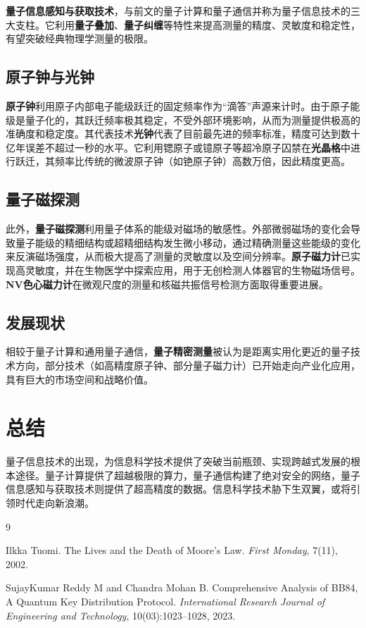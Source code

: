 \documentclass{article}
\begin{document}
\textbf{量子信息感知与获取技术}，与前文的量子计算和量子通信并称为量子信息技术的三大支柱。它利用\textbf{量子叠加}、\textbf{量子纠缠}等特性来提高测量的精度、灵敏度和稳定性，有望突破经典物理学测量的极限。

\subsection{原子钟与光钟}

\textbf{原子钟}利用原子内部电子能级跃迁的固定频率作为“滴答”声源来计时。由于原子能级是量子化的，其跃迁频率极其稳定，不受外部环境影响，从而为测量提供极高的准确度和稳定度。其代表技术\textbf{光钟}代表了目前最先进的频率标准，精度可达到数十亿年误差不超过一秒的水平。它利用锶原子或镱原子等超冷原子囚禁在\textbf{光晶格}中进行跃迁，其频率比传统的微波原子钟（如铯原子钟）高数万倍，因此精度更高。

\subsection{量子磁探测}

此外，\textbf{量子磁探测}利用量子体系的能级对磁场的敏感性。外部微弱磁场的变化会导致量子能级的精细结构或超精细结构发生微小移动，通过精确测量这些能级的变化来反演磁场强度，从而极大提高了测量的灵敏度以及空间分辨率。\textbf{原子磁力计}已实现高灵敏度，并在生物医学中探索应用，用于无创检测人体器官的生物磁场信号。\textbf{NV色心磁力计}在微观尺度的测量和核磁共振信号检测方面取得重要进展。

\subsection{发展现状}

相较于量子计算和通用量子通信，\textbf{量子精密测量}被认为是距离实用化更近的量子技术方向，部分技术（如高精度原子钟、部分量子磁力计）已开始走向产业化应用，具有巨大的市场空间和战略价值。

\section{总结}

量子信息技术的出现，为信息科学技术提供了突破当前瓶颈、实现跨越式发展的根本途径。量子计算提供了超越极限的算力，量子通信构建了绝对安全的网络，量子信息感知与获取技术则提供了超高精度的数据。信息科学技术胁下生双翼，或将引领时代走向新浪潮。

\begin{thebibliography}{9}

Ilkka Tuomi.
\newblock The Lives and the Death of Moore's Law.
\newblock \emph{First Monday}, 7(11), 2002.

SujayKumar Reddy M and Chandra Mohan B.
\newblock Comprehensive Analysis of BB84, A Quantum Key Distribution Protocol.
\newblock \emph{International Research Journal of Engineering and Technology}, 10(03):1023--1028, 2023.

\end{thebibliography}
\end{document}
